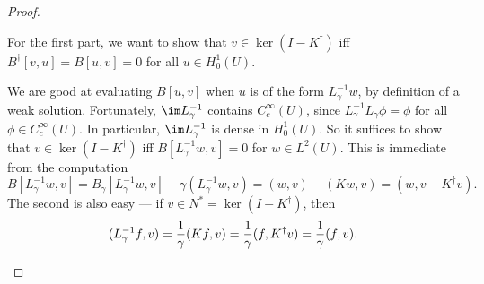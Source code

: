 \documentclass[a4paper]{article}
\begin{document}
\begin{proof}
\begin{enumerate}
      For the first part, we want to show that $v \in \ker (I - K^\dagger)$ iff $B^\dagger [v, u]= B[u, v] = 0$ for all $u \in H_0^1(U)$.

      We are good at evaluating $B[u, v]$ when $u$ is of the form $L_\gamma^{-1} w$, by definition of a weak solution. Fortunately, $\im L_\gamma^{-1}$ contains $C_c^\infty(U)$, since $L_\gamma^{-1} L_\gamma \phi = \phi$ for all $\phi \in C_c^\infty(U)$. In particular, $\im L_\gamma^{-1}$ is dense in $H_0^1(U)$. So it suffices to show that $v \in \ker (I - K^\dagger)$ iff $B[L_\gamma^{-1} w, v] = 0$ for $w \in L^2(U)$. This is immediate from the computation
      \[
        B[L_\gamma^{-1} w, v] = B_\gamma[L_\gamma^{-1} w, v] - \gamma(L_\gamma^{-1} w, v) = (w, v) - (Kw, v) = (w, v - K^\dagger v).
      \]
      The second is also easy --- if $v \in N^* = \ker (I - K^\dagger)$, then
      \[
        (L_\gamma^{-1} f, v) = \frac{1}{\gamma} (Kf, v) = \frac{1}{\gamma} (f, K^\dagger v) = \frac{1}{\gamma} (f, v).\qedhere
      \]
%
%
  \end{enumerate}
\end{proof}
\end{document}
